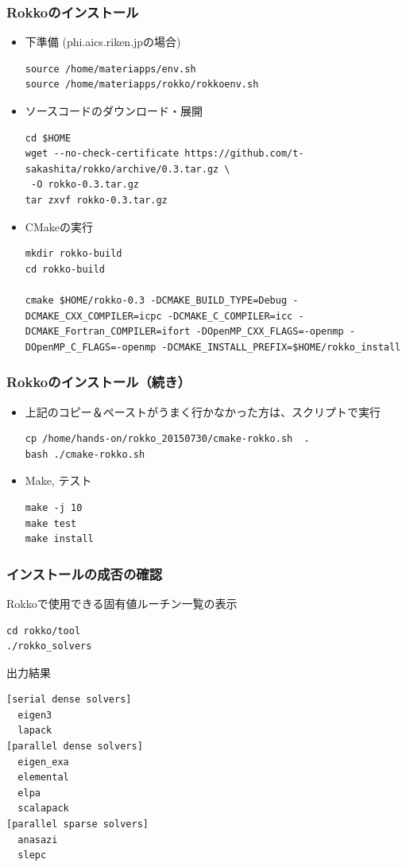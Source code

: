 \begin{frame}[c,fragile]
  \frametitle{Rokkoのインストール}
  \begin{itemize}
  \item 下準備 (phi.aics.riken.jpの場合)
\begin{lstlisting}[style=shstyle]
source /home/materiapps/env.sh
source /home/materiapps/rokko/rokkoenv.sh
\end{lstlisting}
  \item ソースコードのダウンロード・展開
\begin{lstlisting}[style=shstyle]
cd $HOME
wget --no-check-certificate https://github.com/t-sakashita/rokko/archive/0.3.tar.gz \
 -O rokko-0.3.tar.gz
tar zxvf rokko-0.3.tar.gz
\end{lstlisting}
  \item CMakeの実行
\begin{lstlisting}[style=shstyle]
mkdir rokko-build
cd rokko-build

cmake $HOME/rokko-0.3 -DCMAKE_BUILD_TYPE=Debug -DCMAKE_CXX_COMPILER=icpc -DCMAKE_C_COMPILER=icc -DCMAKE_Fortran_COMPILER=ifort -DOpenMP_CXX_FLAGS=-openmp -DOpenMP_C_FLAGS=-openmp -DCMAKE_INSTALL_PREFIX=$HOME/rokko_install
\end{lstlisting}
  \end{itemize}
\end{frame}

\begin{frame}[c,fragile]
  \frametitle{Rokkoのインストール（続き）}
  \begin{itemize}
  \item 上記のコピー＆ペーストがうまく行かなかった方は、スクリプトで実行
\begin{lstlisting}[style=shstyle]
cp /home/hands-on/rokko_20150730/cmake-rokko.sh  .
bash ./cmake-rokko.sh
\end{lstlisting}
  \item Make, テスト
\begin{lstlisting}[style=shstyle]
make -j 10
make test
make install
\end{lstlisting}
  \end{itemize}
\end{frame}

\begin{frame}[c,fragile]
  \frametitle{インストールの成否の確認}
Rokkoで使用できる固有値ルーチン一覧の表示 
\begin{lstlisting}[style=shstyle]
cd rokko/tool
./rokko_solvers
\end{lstlisting}

出力結果
\begin{lstlisting}[style=shstyle]
[serial dense solvers]
  eigen3
  lapack
[parallel dense solvers]
  eigen_exa
  elemental
  elpa
  scalapack
[parallel sparse solvers]
  anasazi
  slepc
\end{lstlisting}

\end{frame}

